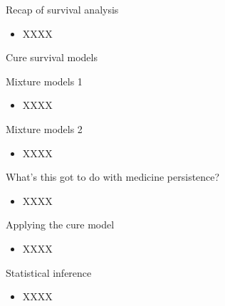 \documentclass[aspectratio=169,12pt]{beamer} %
\begin{document}
\begin{frame}{Recap of survival analysis}
	\begin{itemize}
		\item XXXX
	\end{itemize}
\end{frame}

\begin{frame}{Cure survival models}
\end{frame}

\begin{frame}{Mixture models 1}
	\begin{itemize}
		\item XXXX
	\end{itemize}
\end{frame}

\begin{frame}{Mixture models 2}
	\begin{itemize}
		\item XXXX
	\end{itemize}
\end{frame}


\begin{frame}{What's this got to do with medicine persistence?}
	\begin{itemize}
		\item XXXX
	\end{itemize}
\end{frame}

\begin{frame}{Applying the cure model}
	\begin{itemize}
		\item XXXX
	\end{itemize}
\end{frame}

\begin{frame}{Statistical inference}
    \begin{itemize}
        \item XXXX
    \end{itemize}
\end{frame}
\end{document}
